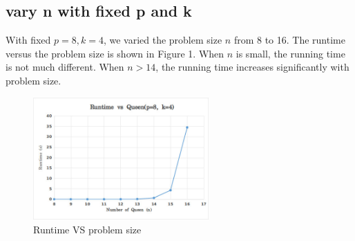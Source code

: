 \documentclass[twoside,12pt]{article}
\begin{document}
\subsection{vary n with fixed p and k}
	With fixed $ p = 8, k = 4 $, we varied the problem size $ n $ from 8 to 16. The runtime versus the problem size is shown in Figure 1. When $ n $ is small, the running time is not much different. When $ n > 14 $, the running time increases significantly with problem size.
	\begin{figure}[H]
		\begin{centering}
		\includegraphics[width=0.6\textwidth]{runVSn}
		\caption{Runtime VS problem size}
	\end{centering}
	\end{figure}
	
\end{document}
